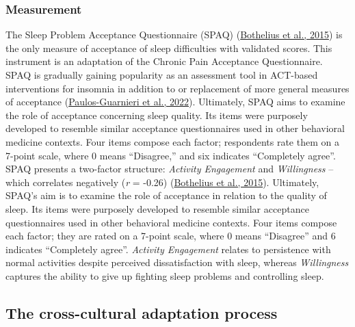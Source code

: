 \documentclass[
  ,doc,11pt, twoside,floatsintext]{apa6}
\begin{document}
\hypertarget{measurement-1}{%
\subsubsection{Measurement}\label{measurement-1}}

The Sleep Problem Acceptance Questionnaire (SPAQ) (\protect\hyperlink{ref-bothelius2015}{Bothelius et al., 2015}) is the only measure of acceptance of sleep difficulties with validated scores. This instrument is an adaptation of the Chronic Pain Acceptance Questionnaire. SPAQ is gradually gaining popularity as an assessment tool in ACT-based interventions for insomnia in addition to or replacement of more general measures of acceptance (\protect\hyperlink{ref-paulos-guarnieri2022}{Paulos-Guarnieri et al., 2022}). Ultimately, SPAQ aims to examine the role of acceptance concerning sleep quality. Its items were purposely developed to resemble similar acceptance questionnaires used in other behavioral medicine contexts. Four items compose each factor; respondents rate them on a 7-point scale, where 0 means ``Disagree,'' and six indicates ``Completely agree''. SPAQ presents a two-factor structure: \emph{Activity Engagement} and \emph{Willingness} -- which correlates negatively (\emph{r} = -0.26) (\protect\hyperlink{ref-bothelius2015}{Bothelius et al., 2015}). Ultimately, SPAQ's aim is to examine the role of acceptance in relation to the quality of sleep. Its items were purposely developed to resemble similar acceptance questionnaires used in other behavioral medicine contexts. Four items compose each factor; they are rated on a 7-point scale, where 0 means ``Disagree'' and 6 indicates ``Completely agree''. \emph{Activity Engagement} relates to persistence with normal activities despite perceived dissatisfaction with sleep, whereas \emph{Willingness} captures the ability to give up fighting sleep problems and controlling sleep.

\hypertarget{the-cross-cultural-adaptation-process}{%
\subsection{The cross-cultural adaptation process}\label{the-cross-cultural-adaptation-process}}
\end{document}
